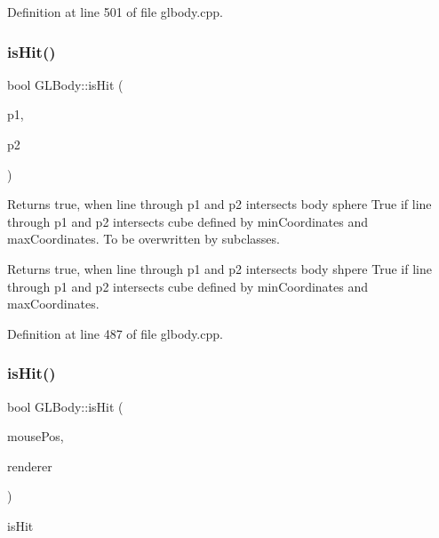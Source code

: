 Definition at line 501 of file glbody.\+cpp.

\mbox{\label{class_g_l_body_abe64b649f2b2ec09b2876d6382258e13}} 
\subsubsection{\texorpdfstring{isHit()}{isHit()}\hspace{0.1cm}{\footnotesize\ttfamily [1/2]}}
{\footnotesize\ttfamily bool G\+L\+Body\+::is\+Hit (\begin{DoxyParamCaption}\item[{Q\+Vector3D}]{p1,  }\item[{Q\+Vector3D}]{p2 }\end{DoxyParamCaption})\hspace{0.3cm}{\ttfamily [virtual]}}

Returns true, when line through p1 and p2 intersects body sphere True if line through p1 and p2 intersects cube defined by min\+Coordinates and max\+Coordinates. To be overwritten by subclasses.

Returns true, when line through p1 and p2 intersects body shpere True if line through p1 and p2 intersects cube defined by min\+Coordinates and max\+Coordinates. 

Definition at line 487 of file glbody.\+cpp.

\mbox{\label{class_g_l_body_ad6855369ac46247ffe0709731e889d23}} 
\subsubsection{\texorpdfstring{isHit()}{isHit()}\hspace{0.1cm}{\footnotesize\ttfamily [2/2]}}
{\footnotesize\ttfamily bool G\+L\+Body\+::is\+Hit (\begin{DoxyParamCaption}\item[{Q\+Point}]{mouse\+Pos,  }\item[{\mbox{\hyperlink{class_g_l_e_s_renderer}{G\+L\+E\+S\+Renderer}} $\ast$}]{renderer }\end{DoxyParamCaption})\hspace{0.3cm}{\ttfamily [virtual]}}



is\+Hit 

